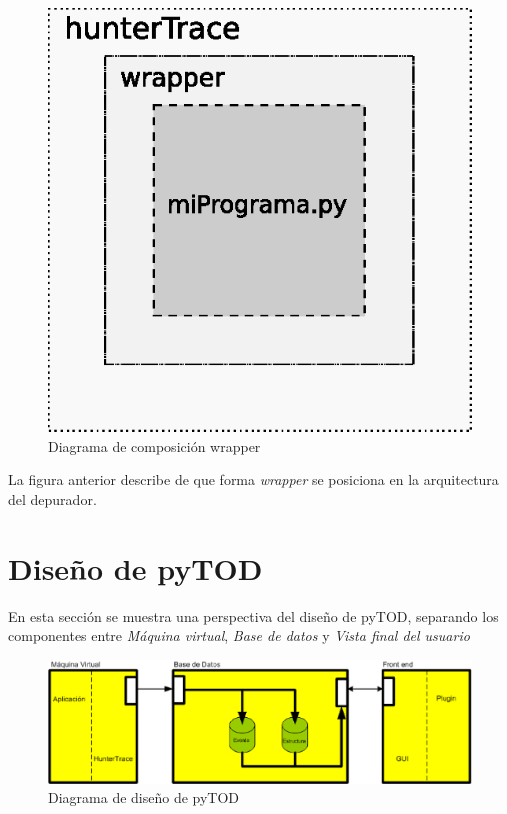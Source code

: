 \documentclass[12pt,legalpaper]{report}
\begin{document}
\begin{figure}[h]
	\centering
	\includegraphics[scale=1]{images/wrapper.eps}
	\caption{Diagrama de composición wrapper}
\end{figure}

La figura anterior describe de que forma \textit{wrapper} se posiciona en la arquitectura del depurador.
		
	
	\section{Diseño de pyTOD}
	
En esta sección se muestra una perspectiva del diseño de pyTOD, separando los componentes entre \textit{Máquina virtual}, \textit{Base de datos} y \textit{Vista final del usuario}

\begin{figure}[hpb]
	\centering
	\includegraphics[scale=0.4]{images/disenopyTOD.eps}
	\caption{Diagrama de diseño de pyTOD}
\end{figure}
\end{document}
